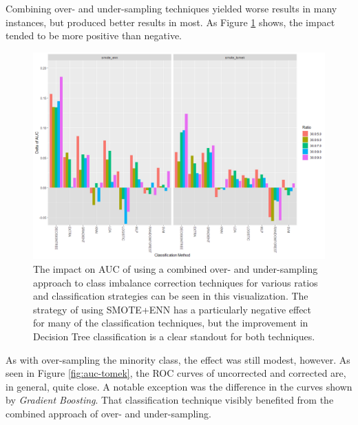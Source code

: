 \documentclass[letterpaper]{article}
\begin{document}
{Combining over- and under-sampling techniques yielded worse results in many instances, but produced better results in most. As Figure \ref{fig:combined} shows, the impact tended to be more positive than negative.
\begin{figure}[H]
	\centering
	\includegraphics[width=0.9\linewidth]{./figures/combined.png}
	\caption[Combined Over and Under-sampling]{The impact on AUC of using a combined over- and under-sampling approach to class imbalance correction techniques for various ratios and classification strategies can be seen in this visualization. The strategy of using SMOTE+ENN has a particularly negative effect for many of the classification techniques, but the improvement in Decision Tree classification is a clear standout for both techniques.}
	\label{fig:combined}
\end{figure}

As with over-sampling the minority class, the effect was still modest, however. As seen in Figure \ref{fig:auc-tomek}, the ROC curves of uncorrected and corrected are, in general, quite close.  A notable exception was the difference in the curves shown by \textit{Gradient Boosting}. That classification technique visibly benefited from the combined approach of over- and under-sampling.

}
\end{document}

